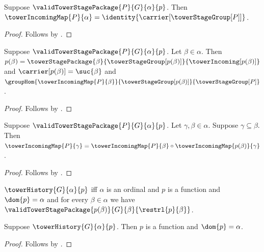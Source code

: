 \begin{proposition}\label{valid_tower_stage_package_identity}
    Suppose $\validTowerStagePackage{P}{G}{\alpha}{p}$.
    Then $\towerIncomingMap{P}{\alpha}=
        \identity{\carrier[\towerStageGroup[P]]}$.
\end{proposition}
\begin{proof}
    Follows by
        .
\end{proof}

\begin{proposition}\label{valid_tower_stage_package_incoming_hom}
    Suppose $\validTowerStagePackage{P}{G}{\alpha}{p}$.
    Let $\beta\in\alpha$.
    Then $p(\beta)=\towerStagePackage{\beta}
            {\towerStageGroup[p(\beta)]}{\towerIncoming[p(\beta)]}$ and
        $\carrier[p(\beta)]=\suc{\beta}$ and
        $\groupHom
            {\towerIncomingMap{P}{\beta}}
            {\towerStageGroup[p(\beta)]}
            {\towerStageGroup[P]}$.
\end{proposition}
\begin{proof}
    Follows by
        .
\end{proof}

\begin{proposition}\label{valid_tower_stage_package_coherence}
    Suppose $\validTowerStagePackage{P}{G}{\alpha}{p}$.
    Let $\gamma,\beta\in\alpha$.
    Suppose $\gamma\subseteq\beta$.
    Then $\towerIncomingMap{P}{\gamma}=
        \towerIncomingMap{P}{\beta}\circ
        \towerIncomingMap{p(\beta)}{\gamma}$.
\end{proposition}
\begin{proof}
    Follows by
        .
\end{proof}

\begin{definition}\label{tower_history}
    $\towerHistory{G}{\alpha}{p}$ iff
        $\alpha$ is an ordinal and
        $p$ is a function and $\dom{p}=\alpha$ and
        for every $\beta\in\alpha$ we have
            $\validTowerStagePackage
                {p(\beta)}{G}{\beta}{\restrl{p}{\beta}}$.
\end{definition}

\begin{proposition}\label{tower_history_function}
    Suppose $\towerHistory{G}{\alpha}{p}$.
    Then $p$ is a function and $\dom{p}=\alpha$.
\end{proposition}
\begin{proof}
    Follows by .
\end{proof}

